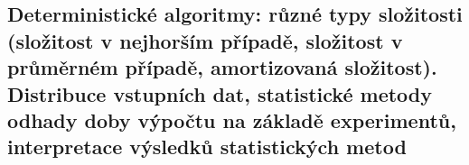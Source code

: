 \subsection{Deterministické algoritmy: různé typy složitosti (složitost v nejhorším případě, složitost v průměrném případě, amortizovaná složitost). Distribuce vstupních dat, statistické metody odhady doby výpočtu na základě experimentů, interpretace výsledků statistických metod}